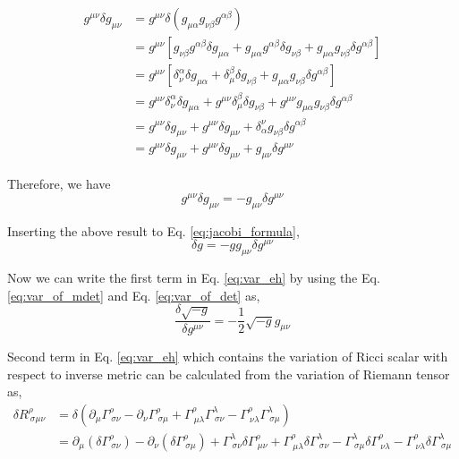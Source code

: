 \begin{equation}
\begin{split}
g^{\mu\nu}\delta g_{\mu\nu} &= g^{\mu\nu}\delta\left(g_{\mu\alpha}g_{\nu\beta}g^{\alpha\beta}\right)\\
&= g^{\mu\nu}\left[g_{\nu\beta}g^{\alpha\beta}\delta g_{\mu\alpha} + g_{\mu\alpha}g^{\alpha\beta}\delta g_{\nu\beta} + g_{\mu\alpha}g_{\nu\beta}\delta g^{\alpha\beta}\right]\\
&= g^{\mu\nu}\left[\delta_{\nu}^{\alpha}\delta g_{\mu\alpha} + \delta_{\mu}^{\beta}\delta g_{\nu\beta} + g_{\mu\alpha}g_{\nu\beta}\delta g^{\alpha\beta}\right]\\
&=g^{\mu\nu}\delta_{\nu}^{\alpha}\delta g_{\mu\alpha} + g^{\mu\nu}\delta_{\mu}^{\beta}\delta g_{\nu\beta} + g^{\mu\nu}g_{\mu\alpha}g_{\nu\beta}\delta g^{\alpha\beta}\\
&= g^{\mu\nu}\delta g_{\mu\nu} + g^{\mu\nu}\delta g_{\mu\nu} + \delta_{\alpha}^{\nu}g_{\nu\beta}\delta g^{\alpha\beta}\\
&= g^{\mu\nu}\delta g_{\mu\nu} + g^{\mu\nu}\delta g_{\mu\nu} + g_{\mu\nu}\delta g^{\mu\nu}
\end{split}
\end{equation}

Therefore, we have
\begin{equation}
g^{\mu\nu}\delta g_{\mu\nu} = -g_{\mu\nu}\delta g^{\mu\nu}
\end{equation}

Inserting the above result to Eq. \ref{eq:jacobi_formula},
\begin{equation}
\label{eq:var_det}
\delta g = -g g_{\mu\nu}\delta g^{\mu\nu}
\end{equation}

Now we can write the first term in Eq. \ref{eq:var_eh} by using the Eq. \ref{eq:var_of_mdet} and Eq. \ref{eq:var_of_det} as,
\begin{equation}
\label{eq:ft}
\frac{\delta\sqrt{-g}}{\delta g^{\mu\nu}} = -\frac{1}{2}\sqrt{-g}g_{\mu\nu}
\end{equation}

Second term in Eq. \ref{eq:var_eh} which contains the variation of Ricci scalar with respect to inverse metric can be calculated from the variation of Riemann tensor as,
\begin{equation}
\label{eq:var_of_rs}
\begin{split}
\delta R^{\rho}_{\ \sigma\mu\nu} &= \delta\left(\partial_{\mu}\Gamma^{\rho}_{\ \sigma\nu} - \partial_{\nu}\Gamma^{\rho}_{\ \sigma\mu} + \Gamma^{\rho}_{\ \mu\lambda}\Gamma^{\lambda}_{\ \sigma\nu} - \Gamma^{\rho}_{\ \nu\lambda}\Gamma^{\lambda}_{\ \sigma\mu}\right)\\
&= \partial_{\mu}\left(\delta\Gamma^{\rho}_{\ \sigma\nu}\right) - \partial_{\nu}\left(\delta\Gamma^{\rho}_{\ \sigma\mu}\right) + \Gamma^{\lambda}_{\ \sigma\nu}\delta\Gamma^{\rho}_{\ \mu\nu} + \Gamma^{\rho}_{\ \mu\lambda}\delta\Gamma^{\lambda}_{\ \sigma\nu} - \Gamma^{\lambda}_{\ \sigma\mu}\delta\Gamma^{\rho}_{\ \nu\lambda} - \Gamma^{\rho}_{\ \nu\lambda}\delta\Gamma^{\lambda}_{\ \sigma\mu}
\end{split}
\end{equation}

